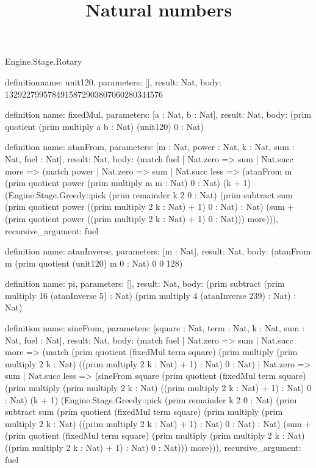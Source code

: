 \begin{lexlean}{Engine.Stage.Rotary}
\title{Natural numbers}
\begin{semanticmodule}
definition{name: unit120, parameters: [], result: Nat, body: 1329227995784915872903807060280344576}

definition{
  name: fixedMul,
  parameters: [a : Nat, b : Nat],
  result: Nat,
  body: (prim quotient (prim multiply a b : Nat) (unit120) 0 : Nat)
}

definition{
  name: atanFrom,
  parameters: [m : Nat, power : Nat, k : Nat, sum : Nat, fuel : Nat],
  result: Nat,
  body: (match fuel
    | Nat.zero => sum
    | Nat.succ more => (match power
      | Nat.zero => sum
      | Nat.succ less => (atanFrom m (prim quotient power (prim multiply m m : Nat) 0 : Nat) (k + 1) (Engine.Stage.Greedy::pick (prim remainder k 2 0 : Nat) (prim subtract sum (prim quotient power ((prim multiply 2 k : Nat) + 1) 0 : Nat) : Nat) (sum + (prim quotient power ((prim multiply 2 k : Nat) + 1) 0 : Nat))) more))),
  recursive_argument: fuel
}

definition{
  name: atanInverse,
  parameters: [m : Nat],
  result: Nat,
  body: (atanFrom m (prim quotient (unit120) m 0 : Nat) 0 0 128)
}

definition{
  name: pi,
  parameters: [],
  result: Nat,
  body: (prim subtract (prim multiply 16 (atanInverse 5) : Nat) (prim multiply 4 (atanInverse 239) : Nat) : Nat)
}

definition{
  name: sineFrom,
  parameters: [square : Nat, term : Nat, k : Nat, sum : Nat, fuel : Nat],
  result: Nat,
  body: (match fuel
    | Nat.zero => sum
    | Nat.succ more => (match (prim quotient (fixedMul term square) (prim multiply (prim multiply 2 k : Nat) ((prim multiply 2 k : Nat) + 1) : Nat) 0 : Nat)
      | Nat.zero => sum
      | Nat.succ less => (sineFrom square (prim quotient (fixedMul term square) (prim multiply (prim multiply 2 k : Nat) ((prim multiply 2 k : Nat) + 1) : Nat) 0 : Nat) (k + 1) (Engine.Stage.Greedy::pick (prim remainder k 2 0 : Nat) (prim subtract sum (prim quotient (fixedMul term square) (prim multiply (prim multiply 2 k : Nat) ((prim multiply 2 k : Nat) + 1) : Nat) 0 : Nat) : Nat) (sum + (prim quotient (fixedMul term square) (prim multiply (prim multiply 2 k : Nat) ((prim multiply 2 k : Nat) + 1) : Nat) 0 : Nat))) more))),
  recursive_argument: fuel
}


\end{semanticmodule}
\end{lexlean}
